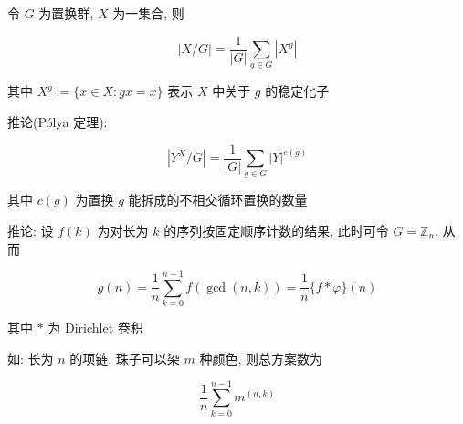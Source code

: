 令 \(G\) 为置换群, \(X\) 为一集合, 则

\[
    |X/G|=\frac{1}{|G|}\sum_{g\in G}\left|X^g\right|
\]

其中 \(X^g:=\{x\in X:gx=x\}\) 表示 \(X\) 中关于 \(g\) 的稳定化子

推论(P\'olya 定理):

\[
    \left|Y^X/G\right|=\frac{1}{|G|}\sum_{g\in G} |Y|^{c(g)}
\]

其中 \(c(g)\) 为置换 \(g\) 能拆成的不相交循环置换的数量

推论: 设 \(f(k)\) 为对长为 \(k\) 的序列按固定顺序计数的结果, 此时可令 \(G=\mathbb{Z}_n\), 从而

\[
    g(n)=\frac{1}{n}\sum_{k=0}^{n-1}f(\gcd(n,k))=\frac{1}{n} \{f*\varphi\}(n)
\]

其中 \(*\) 为 Dirichlet 卷积

如: 长为 \(n\) 的项链, 珠子可以染 \(m\) 种颜色, 则总方案数为

\[
    \frac{1}{n}\sum_{k=0}^{n-1} m^{(n,k)}
\]
